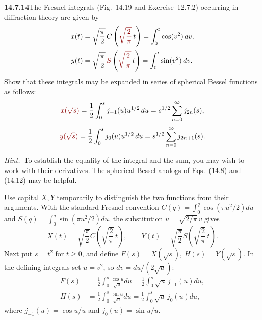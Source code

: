 \par\bigskip
\noindent\textbf{14.7.14}\quad The Fresnel integrals (Fig.~14.19 and
Exercise~12.7.2) occurring in diffraction theory are given by
\begin{align*}
x(t)&=\sqrt{\frac{\pi}{2}}\,C\left(\erratum{\sqrt{\frac{2}{\pi}}}\,t\right)
=\int_{0}^{t}\cos(v^{2})\,dv,\\
y(t)&=\sqrt{\frac{\pi}{2}}\,\erratum{S}\left(\erratum{\sqrt{\frac{2}{\pi}}}\,t\right)
=\int_{0}^{t}\sin(v^{2})\,dv.
\end{align*}
Show that these integrals may be expanded in series of spherical
Bessel functions as follows:
\[
\erratum{x(\sqrt{s})}=\frac{1}{2}\int_{0}^{s}j_{-1}(u)u^{1/2}\,du
=s^{1/2}\sum_{n=0}^{\infty}j_{2n}(s),
\]
\[
\erratum{y(\sqrt{s})}=\frac{1}{2}\int_{0}^{s}j_{0}(u)u^{1/2}\,du
=s^{1/2}\sum_{n=0}^{\infty}j_{2n+1}(s).
\]
\par\emph{Hint.}~To establish the equality of the integral and the
sum, you may wish to work with their derivatives. The spherical Bessel
analogs of Eqs.~(14.8) and (14.12) may be helpful.
\par{}
\solution
Use capital $X,Y$ temporarily to distinguish the two
functions from their arguments. With the standard Fresnel
convention $C(q)=\int_0^q\cos(\pi u^2/2)du$ and
$S(q)=\int_0^q\sin(\pi u^2/2)du$, the substitution
$u=\sqrt{2/\pi}\,v$ gives
\[
X(t)=\sqrt{\frac\pi2}C\left(\sqrt{\frac2\pi}\,t\right),\qquad
Y(t)=\sqrt{\frac\pi2}S\left(\sqrt{\frac2\pi}\,t\right).
\]
Next put $s=t^2$ for $t\ge0$, and define
$F(s)=X(\sqrt{s})$, $H(s)=Y(\sqrt{s})$. In the defining
integrals set $u=v^2$, so $dv=du/(2\sqrt u)$:
\begin{align*}
F(s)&=\frac12\int_0^s\frac{\cos u}{\sqrt u}du
=\frac12\int_0^s\sqrt u\,j_{-1}(u)du,\\
H(s)&=\frac12\int_0^s\frac{\sin u}{\sqrt u}du
=\frac12\int_0^s\sqrt u\,j_0(u)du,
\end{align*}
where $j_{-1}(u)=\cos u/u$ and $j_0(u)=\sin u/u$.

